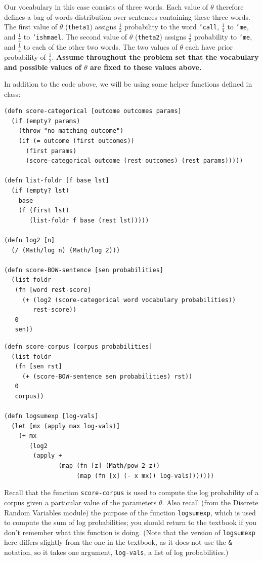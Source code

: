 \documentclass[10pt]{article}
\begin{document}
Our vocabulary in this case consists of three words. Each value of
$\theta$ therefore defines a bag of words distribution over sentences
containing these three words. The first value of $\theta$
(\texttt{theta1}) assigns $\frac{1}{2}$ probability to the word
\texttt{'call}, $\frac{1}{4}$ to \texttt{'me}, and $\frac{1}{4}$ to
\texttt{'ishmael}. The second value of $\theta$ (\texttt{theta2})
assigns $\frac{1}{2}$ probability to \texttt{'me}, and $\frac{1}{4}$
to each of the other two words. The two values of $\theta$ each have
prior probability of $\frac{1}{2}$. \textbf{Assume throughout the
  problem set that the vocabulary and possible values of $\theta$ are
  fixed to these values above.}

In addition to the code above, we will be using some helper functions defined in class:

\begin{lstlisting}
(defn score-categorical [outcome outcomes params]
  (if (empty? params)
    (throw "no matching outcome")
    (if (= outcome (first outcomes))
      (first params)
      (score-categorical outcome (rest outcomes) (rest params)))))

(defn list-foldr [f base lst]
  (if (empty? lst)
    base
    (f (first lst)
       (list-foldr f base (rest lst)))))

(defn log2 [n]
  (/ (Math/log n) (Math/log 2)))

(defn score-BOW-sentence [sen probabilities]
  (list-foldr
   (fn [word rest-score]
     (+ (log2 (score-categorical word vocabulary probabilities))
        rest-score))
   0
   sen))
\end{lstlisting}
\clearpage
\begin{lstlisting}
(defn score-corpus [corpus probabilities]
  (list-foldr
   (fn [sen rst]
     (+ (score-BOW-sentence sen probabilities) rst))
   0
   corpus))

(defn logsumexp [log-vals]
  (let [mx (apply max log-vals)]
    (+ mx
       (log2
        (apply +
               (map (fn [z] (Math/pow 2 z))
                    (map (fn [x] (- x mx)) log-vals)))))))
\end{lstlisting}

Recall that the function \texttt{score-corpus} is used to compute the
log probability of a corpus given a particular value of the parameters
$\theta$. Also recall (from the Discrete Random Variables module) the
purpose of the function \texttt{logsumexp}, which is used to compute
the sum of log probabilities; you should return to the textbook
if you don't remember what this function is doing. (Note that the
version of \texttt{logsumexp} here differs slightly from the one in the textbook, as it does not use the \texttt{\&} notation, so it takes one
argument, \texttt{log-vals}, a list of log probabilities.)
\end{document}
